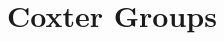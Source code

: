 \documentclass[a4paper,11pt]{article}
\def\maintitle#1{\section*{#1}}
\def\subtitle#1{\section{#1}}
\begin{document}
\else %
    \ifx\chaptitle\undefined %
        \def\maintitle#1{\subsection{#1}}
        \def\subtitle#1{\subsubsection{#1}}
    \else %
        \def\maintitle#1{\section{#1}}
        \def\subtitle#1{\subsection{#1}}
    \fi
\fi

\maintitle{Coxter Groups}





\ifx\ChapTwoSecEight\undefined %
     
\end{document}
